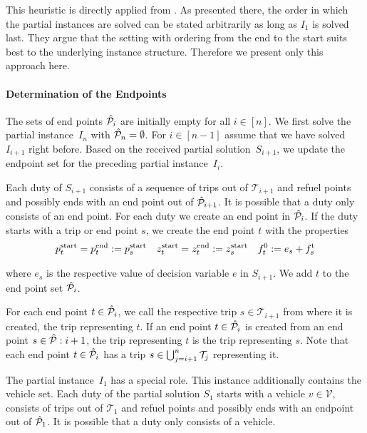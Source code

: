 This heuristic is directly applied from \cite[Sec.~10.4]{Knoll}. As presented there, the order in which the partial instances are solved can be stated arbitrarily as long as $I_1$ is solved last. They argue that the setting with ordering from the end to the start suits best to the underlying instance structure. Therefore we present only this approach here.

\paragraph{Determination of the Endpoints} \parfill

The sets of end points $\hat{\mathcal{P}}_i$ are initially empty for all $i\in[n]$. We first solve the partial instance~$I_n$ with ${\hat{\mathcal{P}}_n = \emptyset}$. For ${i\in[n-1]}$ assume that we have solved $I_{i+1}$ right before. Based on the received partial solution~$S_{i+1}$, we update the endpoint set for the preceding partial instance~$I_i$.

Each duty of $S_{i+1}$ consists of a sequence of trips out of $\mathcal{T}_{i+1}$ and refuel points and possibly ends with an end point out of $\hat{\mathcal{P}}_{i+1}$. It is possible that a duty only consists of an end point. For each duty we create an end point in $\hat{\mathcal{P}}_i$. If the duty starts with a trip or end point $s$, we create the end point $t$ with the properties
\begin{align*}
	p^{\operatorname{start}}_t = p^{\operatorname{end}}_t := p^{\operatorname{start}}_s && z^{\operatorname{start}}_t = z^{\operatorname{end}}_t := z^{\operatorname{start}}_s && f_t^0 := e_s + f^{\operatorname{t}}_s
\end{align*}

where $e_s$ is the respective value of decision variable $e$ in $S_{i+1}$. We add $t$ to the end point set $\hat{\mathcal{P}}_i$.

For each end point $t\in\hat{\mathcal{P}}_i$, we call the respective trip $s\in\mathcal{T}_{i+1}$ from where it is created, the trip representing $t$. If an end point $t\in\hat{\mathcal{P}}_i$ is created from an end point $s\in\hat{\mathcal{P}}:{i+1}$, the trip representing $t$ is the trip representing $s$. Note that each end point $t\in\hat{\mathcal{P}}_i$ has a trip ${s\in\bigcup_{j=i+1}^n\mathcal{T}_j}$ representing it.

The partial instance~$I_1$ has a special role. This instance additionally contains the vehicle set. Each duty of the partial solution $S_1$ starts with a vehicle $v\in\mathcal{V}$, consists of trips out of $\mathcal{T}_1$ and refuel points and possibly ends with an endpoint out of $\hat{\mathcal{P}}_1$. It is possible that a duty only consists of a vehicle.

